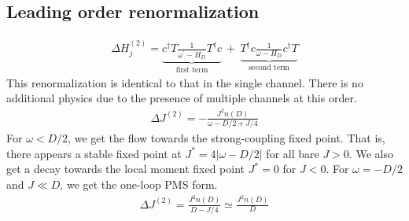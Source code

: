 \subsection{Leading order renormalization}
\begin{equation}\begin{aligned}
	\Delta H^{(2)}_j = \underbrace{c^\dagger T \frac{1}{\omega^\prime - H_D}T^\dagger c}_\text{first term}~+~\underbrace{T^\dagger c \frac{1}{\omega - H_D}c^\dagger T}_\text{second term}
\end{aligned}\end{equation}
This renormalization is identical to that in the single channel. There is no additional physics due to the presence of multiple channels at this order.
\begin{equation}\begin{aligned}
	\Delta J^{(2)} = -\frac{J^2 n(D)}{\omega - D/2 + J/4}
\end{aligned}\end{equation}
For \(\omega < D/2\), we get the flow towards the strong-coupling fixed point. That is, there appears a stable fixed point at \(J^* = 4|\omega - D/2|\) for all bare \(J > 0\). We also get a decay towards the local moment fixed point \(J^* = 0\) for \(J < 0\). For \(\omega = -D/2\) and \(J \ll D\), we get the one-loop PMS form. 
\begin{equation}\begin{aligned}
	\Delta J^{(2)} = \frac{J^2 n(D)}{D - J/4} \simeq \frac{J^2 n(D)}{D}
\end{aligned}\end{equation}
